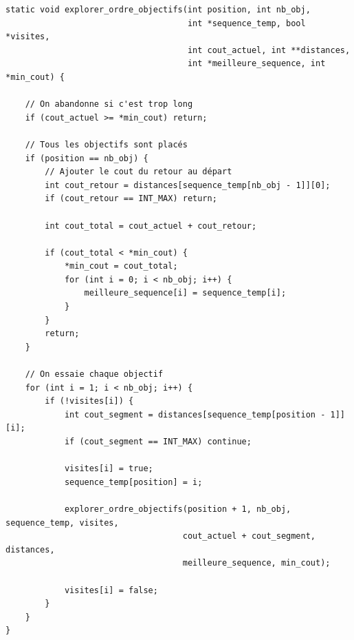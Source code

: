 \begin{lstlisting}[caption={explorer\_ordre\_objectifs}]
static void explorer_ordre_objectifs(int position, int nb_obj,
                                     int *sequence_temp, bool *visites,
                                     int cout_actuel, int **distances,
                                     int *meilleure_sequence, int *min_cout) {
    
    // On abandonne si c'est trop long 
    if (cout_actuel >= *min_cout) return;

    // Tous les objectifs sont placés
    if (position == nb_obj) {
        // Ajouter le cout du retour au départ
        int cout_retour = distances[sequence_temp[nb_obj - 1]][0];
        if (cout_retour == INT_MAX) return;
        
        int cout_total = cout_actuel + cout_retour;
        
        if (cout_total < *min_cout) {
            *min_cout = cout_total;
            for (int i = 0; i < nb_obj; i++) {
                meilleure_sequence[i] = sequence_temp[i];
            }
        }
        return;
    }

    // On essaie chaque objectif 
    for (int i = 1; i < nb_obj; i++) {
        if (!visites[i]) {
            int cout_segment = distances[sequence_temp[position - 1]][i];
            if (cout_segment == INT_MAX) continue;
            
            visites[i] = true;
            sequence_temp[position] = i;
            
            explorer_ordre_objectifs(position + 1, nb_obj, sequence_temp, visites,
                                    cout_actuel + cout_segment, distances,
                                    meilleure_sequence, min_cout);
            
            visites[i] = false;
        }
    }
}
\end{lstlisting}